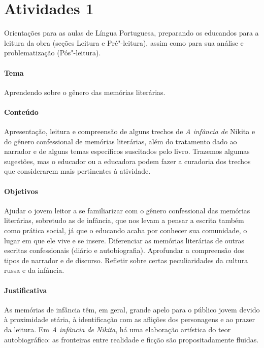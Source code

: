 \documentclass[11pt]{extarticle}
\begin{document}
\tableofcontents

\section{Atividades 1}

\bnccativividadespreleitura

Orientações para as aulas de Língua Portuguesa, preparando os
educandos para a leitura da obra (seções Leitura e Pré"-leitura), assim como para
sua análise e problematização (Pós"-leitura).

\paragraph{Tema} Aprendendo sobre o gênero das memórias literárias.

\paragraph{Conteúdo}
Apresentação, leitura e compreensão de alguns trechos de \emph{A
infância de} Nikita e do gênero confessional de memórias literárias,
além do tratamento dado ao narrador e de alguns temas específicos
suscitados pelo livro. Trazemos algumas sugestões, mas o educador ou a
educadora podem fazer a curadoria dos trechos que considerarem mais
pertinentes à atividade.

\paragraph{Objetivos}
Ajudar o jovem leitor a se familiarizar com o gênero confessional das
memórias literárias, sobretudo as de infância, que nos levam a pensar a
escrita também como prática social, já que o educando acaba por conhecer
sua comunidade, o lugar em que ele vive e se insere. Diferenciar as
memórias literárias de outras escritas confessionais (diário e
autobiografia). Aprofundar a compreensão dos tipos de narrador e de
discurso. Refletir sobre certas peculiaridades da cultura russa e da
infância.

\paragraph{Justificativa}
As memórias de infância têm, em geral, grande apelo para o público jovem
devido à proximidade etária, à identificação com as aflições dos
personagens e ao prazer da leitura. Em \emph{A infância de Nikita}, há
uma elaboração artística do teor autobiográfico: as fronteiras entre
realidade e ficção são propositadamente fluidas.
\end{document}
